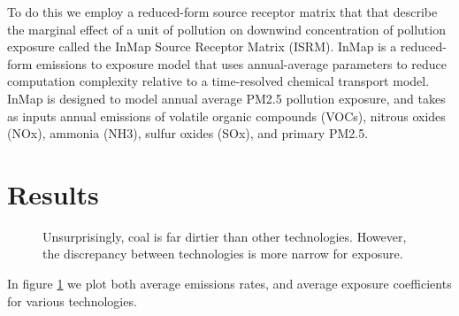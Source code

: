 \documentclass[a4paper]{article}
\theoremstyle{definition}
\theoremstyle{plain}
\begin{document}
To do this we employ a reduced-form source receptor matrix that that describe the marginal effect of a unit of pollution on downwind concentration of pollution exposure called the InMap Source Receptor Matrix (ISRM).  InMap is a reduced-form emissions to exposure model that uses annual-average parameters to reduce computation complexity relative to a time-resolved chemical transport model. InMap is designed to model annual average PM2.5 pollution exposure, and takes as inputs annual emissions of volatile organic compounds (VOCs), nitrous oxides (NOx), ammonia (NH3), sulfur oxides (SOx), and primary PM2.5.

\section{Results}

\begin{figure}
\centering
{}%
\hfill
{}%
\hfill
\caption{Unsurprisingly, coal is far dirtier than other technologies.  However, the discrepancy between technologies is more narrow for exposure.}
\label{EmissionsExposureCoefs}
\end{figure}
In figure \ref{EmissionsExposureCoefs} we plot both average emissions rates, and average exposure coefficients for various technologies.  
\end{document}
